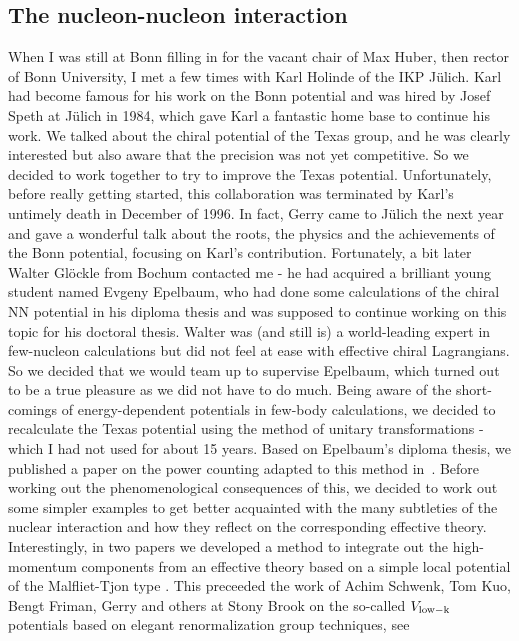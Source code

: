 \documentclass[a4paper,fleqn]{scrartcl}
\begin{document}
{\subsection{The nucleon-nucleon interaction}
When I was still at Bonn filling in for the vacant chair of Max Huber, then 
rector of Bonn University, I met a few times with Karl Holinde of the IKP
J\"ulich. Karl had become famous for his work on the Bonn potential and 
was hired by Josef Speth at J\"ulich in 1984, which gave Karl a fantastic
home base to continue his work. We talked about the chiral potential
of the Texas group, and he was clearly interested but also aware that the
precision was not yet competitive. So we decided to work together to try
to improve the Texas potential. Unfortunately, before really getting started,
this collaboration was terminated by Karl's untimely death in December of 1996.
In fact, Gerry came to J\"ulich the next year and gave a wonderful talk about the
roots, the physics and the achievements of the Bonn potential, focusing on
Karl's contribution. Fortunately, a bit later Walter Gl\"ockle from Bochum
contacted me - he had acquired a brilliant young student named Evgeny
Epelbaum,  who had done some calculations of the chiral NN potential in his 
diploma thesis and was supposed to continue working on this topic for his
doctoral thesis. Walter was (and still is) a world-leading expert in 
few-nucleon calculations but did not feel at
ease with effective chiral Lagrangians. So we decided that we would team
up to supervise Epelbaum, which turned out to be a true pleasure as we
did not have to do much. Being aware of the short-comings of energy-dependent
potentials in few-body calculations, we decided to recalculate the Texas
potential using the method of unitary transformations - which I had not used
for about  15 years. Based on Epelbaum's diploma thesis, we published
a paper on the power counting adapted to this method in~\cite{Epelbaum:1998ka}.
Before working out the phenomenological consequences of this, we decided
to work out some simpler examples to get better acquainted with the many
subtleties of the nuclear interaction and how they reflect on the
corresponding effective theory. Interestingly, in two papers we developed
a method to integrate out the high-momentum components from an effective
theory based on a simple local potential of the Malfliet-Tjon type \cite{Epelbaum:1998hg}. 
This preceeded the work of Achim Schwenk, Tom
Kuo, Bengt Friman, Gerry and others at Stony Brook on the so-called $V_{\rm
  low-k}$ potentials based on elegant renormalization group techniques, see
}
\end{document}
